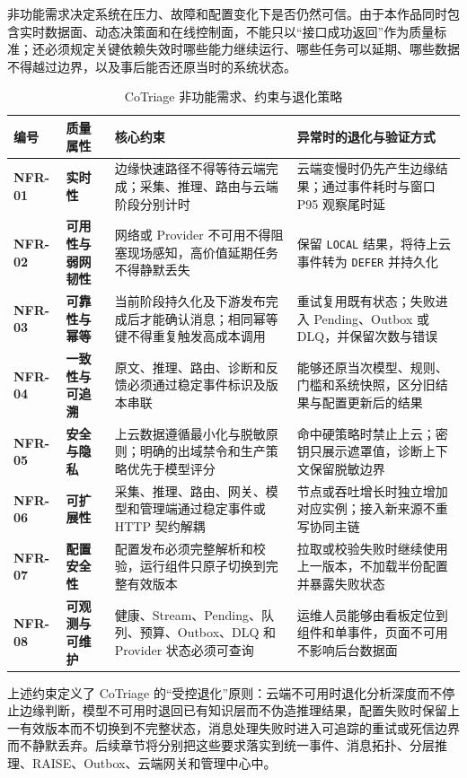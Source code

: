 非功能需求决定系统在压力、故障和配置变化下是否仍然可信。由于本作品同时包含实时数据面、动态决策面和在线控制面，不能只以“接口成功返回”作为质量标准；还必须规定关键依赖失效时哪些能力继续运行、哪些任务可以延期、哪些数据不得越过边界，以及事后能否还原当时的系统状态。

\begin{table}[htbp]
  \centering
  \footnotesize
  \caption{CoTriage 非功能需求、约束与退化策略}
  \label{tab:nonfunctional-requirements}
  \begin{tabularx}{\textwidth}{>{\bfseries\ttfamily}p{} >{\bfseries}p{} X X}
    \toprule
    \normalfont 编号 & 质量属性 & 核心约束 & 异常时的退化与验证方式 \\
    \midrule
    NFR-01 & 实时性 & 边缘快速路径不得等待云端完成；采集、推理、路由与云端阶段分别计时 & 云端变慢时仍先产生边缘结果；通过事件耗时与窗口 P95 观察尾时延 \\
    NFR-02 & 可用性与弱网韧性 & 网络或 Provider 不可用不得阻塞现场感知，高价值延期任务不得静默丢失 & 保留 \texttt{LOCAL} 结果，将待上云事件转为 \texttt{DEFER} 并持久化 \\
    NFR-03 & 可靠性与幂等 & 当前阶段持久化及下游发布完成后才能确认消息；相同幂等键不得重复触发高成本调用 & 重试复用既有状态；失败进入 Pending、Outbox 或 DLQ，并保留次数与错误 \\
    NFR-04 & 一致性与可追溯 & 原文、推理、路由、诊断和反馈必须通过稳定事件标识及版本串联 & 能够还原当次模型、规则、门槛和系统快照，区分旧结果与配置更新后的结果 \\
    NFR-05 & 安全与隐私 & 上云数据遵循最小化与脱敏原则；明确的出域禁令和生产策略优先于模型评分 & 命中硬策略时禁止上云；密钥只展示遮罩值，诊断上下文保留脱敏边界 \\
    NFR-06 & 可扩展性 & 采集、推理、路由、网关、模型和管理端通过稳定事件或 HTTP 契约解耦 & 节点或吞吐增长时独立增加对应实例；接入新来源不重写协同主链 \\
    NFR-07 & 配置安全性 & 配置发布必须完整解析和校验，运行组件只原子切换到完整有效版本 & 拉取或校验失败时继续使用上一版本，不加载半份配置并暴露失败状态 \\
    NFR-08 & 可观测与可维护 & 健康、Stream、Pending、队列、预算、Outbox、DLQ 和 Provider 状态必须可查询 & 运维人员能够由看板定位到组件和单事件，页面不可用不影响后台数据面 \\
    \bottomrule
  \end{tabularx}
\end{table}

上述约束定义了 CoTriage 的“受控退化”原则：云端不可用时退化分析深度而不停止边缘判断，模型不可用时退回已有知识层而不伪造推理结果，配置失败时保留上一有效版本而不切换到不完整状态，消息处理失败时进入可追踪的重试或死信边界而不静默丢弃。后续章节将分别把这些要求落实到统一事件、消息拓扑、分层推理、RAISE、Outbox、云端网关和管理中心中。
